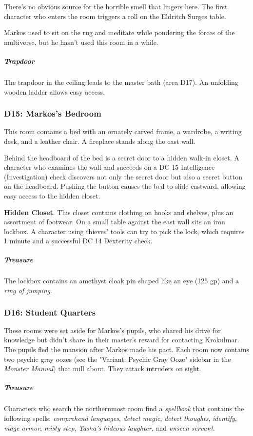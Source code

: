 \documentclass[10pt,a4paper,twoside,bg=print,twocolumn,openany,nodeprecatedcode]{dndbook}
\begin{document}
There's no obvious source for the horrible smell that lingers here. The first character who enters the room triggers a roll on the Eldritch Surges table.

Markos used to sit on the rug and meditate while pondering the forces of the multiverse, but he hasn't used this room in a while.

\subparagraph{Trapdoor}
The trapdoor in the ceiling leads to the master bath (area D17). An unfolding wooden ladder allows easy access.

\subsubsection{D15: Markos's Bedroom}
\begin{DndReadAloud}{}
This room contains a bed with an ornately carved frame, a wardrobe, a writing desk, and a leather chair. A fireplace stands along the east wall.

\end{DndReadAloud}

Behind the headboard of the bed is a secret door to a hidden walk-in closet. A character who examines the wall and succeeds on a DC 15 Intelligence (Investigation) check discovers not only the secret door but also a secret button on the headboard. Pushing the button causes the bed to slide eastward, allowing easy access to the hidden closet.

\textbf{Hidden Closet}. This closet contains clothing on hooks and shelves, plus an assortment of footwear. On a small table against the east wall sits an iron lockbox. A character using thieves' tools can try to pick the lock, which requires 1 minute and a successful DC 14 Dexterity check.

\subparagraph{Treasure}
The lockbox contains an amethyst cloak pin shaped like an eye (125 gp) and a \textit{ring of jumping}.

\subsubsection{D16: Student Quarters}
These rooms were set aside for Markos's pupils, who shared his drive for knowledge but didn't share in their master's reward for contacting Krokulmar. The pupils fled the mansion after Markos made his pact. Each room now contains two psychic gray oozes (see the "Variant: Psychic Gray Ooze" sidebar in the \textit{Monster Manual}) that mill about. They attack intruders on sight.

\subparagraph{Treasure}
Characters who search the northernmost room find a \textit{spellbook} that contains the following spells: \textit{comprehend languages}, \textit{detect magic}, \textit{detect thoughts}, \textit{identify}, \textit{mage armor}, \textit{misty step}, \textit{Tasha's hideous laughter}, and \textit{unseen servant}.
\end{document}
